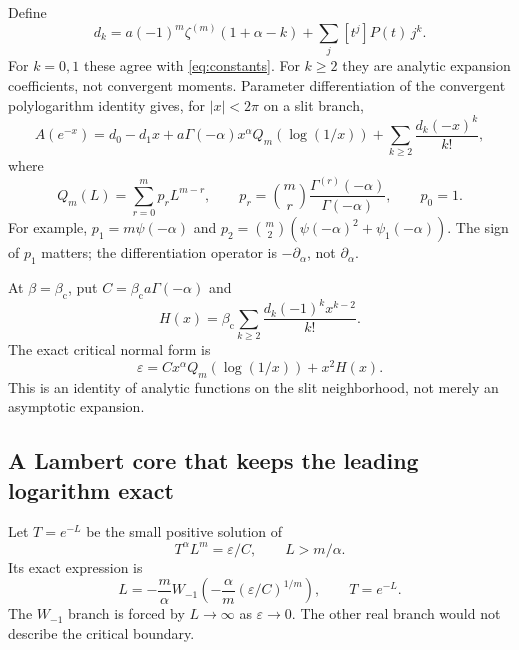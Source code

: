 \documentclass[11pt,a4paper]{article}
\numberwithin{equation}{section}
\theoremstyle{definition}\newtheorem{definition}[theorem]{Definition}
\theoremstyle{remark}\newtheorem{remark}[theorem]{Remark}
\theoremstyle{definition}
\newcommand{\bc}{\beta_{\mathrm c}}\newcommand{\rhoc}{\rho_{\mathrm c}}
\begin{document}
Define
\begin{equation}\label{eq:dklog}
 d_k=a(-1)^m\zeta^{(m)}(1+\alpha-k)+\sum_j [t^j]P(t)\,j^k.
\end{equation}
For $k=0,1$ these agree with \eqref{eq:constants}. For $k\ge2$ they are
analytic expansion coefficients, not convergent moments.
Parameter differentiation of the convergent polylogarithm identity
\cite[Eq.~25.12.12]{dlmf-polylog} gives, for $|x|<2\pi$ on a slit branch,
\begin{equation}\label{eq:lognormal}
 A(e^{-x})=d_0-d_1x+a\Gamma(-\alpha)x^\alpha Q_m(\log(1/x))
                  +\sum_{k\ge2}\frac{d_k(-x)^k}{k!},
\end{equation}
where
\begin{equation}\label{eq:Q}
 Q_m(L)=\sum_{r=0}^m p_r L^{m-r},\qquad
 p_r=\binom mr\frac{\Gamma^{(r)}(-\alpha)}{\Gamma(-\alpha)},\qquad p_0=1.
\end{equation}
For example, $p_1=m\psi(-\alpha)$ and
$p_2=\binom m2(\psi(-\alpha)^2+\psi_1(-\alpha))$.
The sign of $p_1$ matters; the differentiation operator is
$-\partial_\alpha$, not $\partial_\alpha$.

At $\beta=\bc$, put $C=\bc a\Gamma(-\alpha)$ and
\[
 H(x)=\bc\sum_{k\ge2}\frac{d_k(-1)^k x^{k-2}}{k!}.
\]
The exact critical normal form is
\begin{equation}\label{eq:exactnormal}
 \boxed{\quad\varepsilon=Cx^\alpha Q_m(\log(1/x))+x^2H(x).\quad}
\end{equation}
This is an identity of analytic functions on the slit neighborhood, not
merely an asymptotic expansion.

\subsection{A Lambert core that keeps the leading logarithm exact}
Let $T=e^{-L}$ be the small positive solution of
\begin{equation}\label{eq:core}
 T^\alpha L^m=\varepsilon/C,\qquad L>m/\alpha.
\end{equation}
Its exact expression is
\begin{equation}\label{eq:Lambertcore}
 L=-\frac m\alpha W_{-1}\!\left(
      -\frac\alpha m(\varepsilon/C)^{1/m}\right),\qquad T=e^{-L}.
\end{equation}
The $W_{-1}$ branch is forced by $L\to\infty$ as $\varepsilon\to0$.
The other real branch would not describe the critical boundary.
\end{document}
